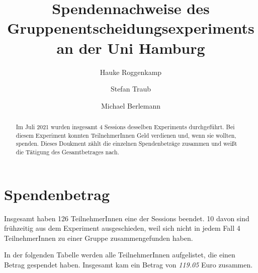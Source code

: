 \documentclass[]{elsarticle} %
\begin{document}
\begin{frontmatter}

  \title{Spendennachweise des Gruppenentscheidungsexperiments an der Uni
Hamburg}
    \author[Helmut-Schmidt-Universität]{Hauke Roggenkamp}
    \author[Helmut-Schmidt-Universität]{Stefan Traub}
  
    \author[Helmut-Schmidt-Universität]{Michael Berlemann}
  
      \address[Helmut-Schmidt-Universität]{Holstenhofweg 85, 22043
Hamburg}
  
  \begin{abstract}
  Im Juli 2021 wurden insgesamt 4 Sessions desselben Experiments
  durchgeführt. Bei diesem Experiment konnten TeilnehmerInnen Geld
  verdienen und, wenn sie wollten, spenden. Dieses Doukment zählt die
  einzelnen Spendenbeträge zusammen und weißt die Tätigung des
  Gesamtbetrages nach.
  \end{abstract}
  
 \end{frontmatter}

\hypertarget{spendenbetrag}{%
\section{Spendenbetrag}\label{spendenbetrag}}

Insgesamt haben 126 TeilnehmerInnen eine der Sessions beendet. 10 davon
sind frühzeitig aus dem Experiment ausgeschieden, weil sich nicht in
jedem Fall 4 TeilnehmerInnen zu einer Gruppe zusammengefunden haben.

In der folgenden Tabelle werden alle TeilnehmerInnen aufgelistet, die
einen Betrag gespendet haben. Insgesamt kam ein Betrag von \emph{119.05}
Euro zusammen.

\begingroup\fontsize{7}{9}\selectfont
\end{document}
